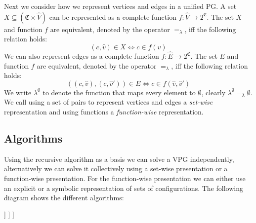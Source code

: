Next we consider how we represent vertices and edges in a unified PG. A set $X \subseteq (\mathfrak{C} \times \hat{V})$ can be represented as a complete function $f : \hat{V} \rightarrow 2^\mathfrak{C}$. The set $X$ and function $f$ are equivalent, denoted by the operator $=_\lambda$, iff the following relation holds:
\[ (c,\hat{v}) \in X \iff c \in f(\hat{v}) \]
We can also represent edges as a complete function $f : \hat{E} \rightarrow 2^\mathfrak{C}$. The set $E$ and function $f$ are equivalent, denoted by the operator $=_\lambda$, iff the following relation holds:
\[ ((c,\hat{v}),(c,\hat{v}')) \in E \iff c \in f(\hat{v},\hat{v}') \]
We write $\lambda^\emptyset$ to denote the function that maps every element to $\emptyset$, clearly $\lambda^\emptyset =_\lambda \emptyset$. We call using a set of pairs to represent vertices and edges a \textit{set-wise} representation and using functions a \textit{function-wise} representation.

\subsection{Algorithms}
Using the recursive algorithm as a basis we can solve a VPG independently, alternatively we can solve it collectively using a set-wise presentation or a function-wise presentation. For the function-wise presentation we can either use an explicit or a symbolic representation of sets of configurations. The following diagram shows the different algorithms:
\begin{center}
	\begin{forest}
		[Recursive algorithm, for tree={parent anchor=south, child anchor=north, align=center, s sep=5mm}
		[Independent]
		[Collective
		[Set-wise]
		[Function-wise
		[Explicit]
		[Symbolic]
		]
		]
		]
	\end{forest}
\end{center}

